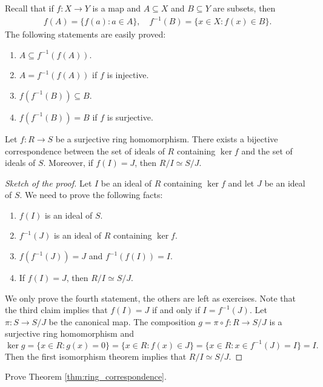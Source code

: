 Recall that if $f\colon X\to Y$ is a map and $A\subseteq X$ and $B\subseteq Y$ are
subsets, then
\begin{align*}
    f(A)=\{f(a):a\in A\},\quad 
    f^{-1}(B)=\{x\in X:f(x)\in B\}.
\end{align*}
The following statements are easily proved:
\begin{enumerate}
	\item $A\subseteq f^{-1}(f(A))$. 
	\item $A=f^{-1}(f(A))$ if $f$ is injective. 
	\item $f(f^{-1}(B))\subseteq B$. 
	\item $f(f^{-1}(B))=B$ if $f$ is surjective. 
\end{enumerate}

\begin{theorem}
\label{thm:ring_correspondence}
	Let $f\colon R\to S$ be a surjective ring homomorphism. There exists a
	bijective correspondence between 
	the set of ideals of $R$ containing $\ker f$ and
	the set of ideals of $S$.  Moreover, if $f(I)=J$, then
	$R/I\simeq S/J$. 
\end{theorem}

\begin{proof}[Sketch of the proof]
Let $I$ be an ideal of $R$ containing $\ker f$ and
let $J$ be an ideal of $S$. 
We need to prove the following facts:
\begin{enumerate}
\item $f(I)$ is an ideal of $S$.
\item $f^{-1}(J)$ is an ideal of $R$ containing $\ker f$. 
\item $f(f^{-1}(J))=J$ and $f^{-1}(f(I))=I$. 
\item If $f(I)=J$, then $R/I\simeq S/J$. 
\end{enumerate}
We only prove the fourth statement, the others are left as exercises. Note that
the third claim implies that $f(I)=J$ if and only if $I=f^{-1}(J)$. 
Let 
$\pi\colon S\to S/J$ be the canonical map. The composition
$g=\pi\circ f\colon R\to S/J$ is a surjective ring homomorphism and
\[
\ker g=\{x\in R:g(x)=0\}=\{x\in R:f(x)\in J\}=\{x\in R:x\in f^{-1}(J)=I\}=I.
\]
Then the first isomorphism theorem implies that $R/I\simeq S/J$.
\end{proof}

\begin{exercise}
    Prove Theorem \ref{thm:ring_correspondence}.
\end{exercise}

